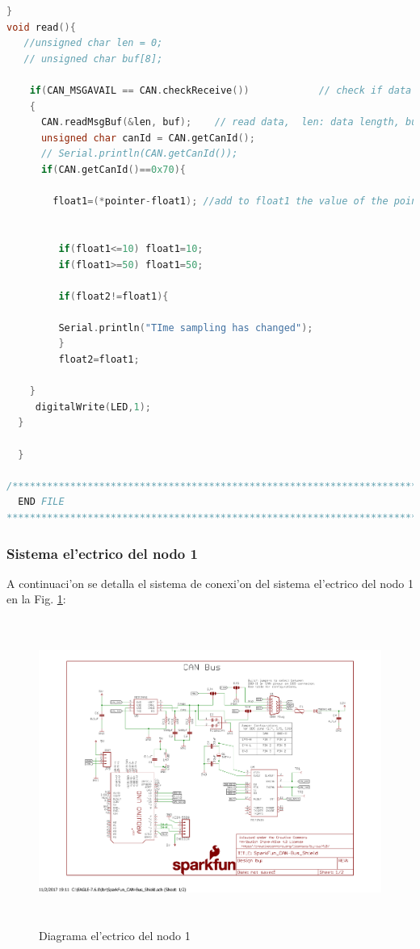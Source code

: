 {\begin{lstlisting}[language=C]
   }
void read(){
   //unsigned char len = 0;
   // unsigned char buf[8];

    if(CAN_MSGAVAIL == CAN.checkReceive())            // check if data coming
    {
      CAN.readMsgBuf(&len, buf);    // read data,  len: data length, buf: data buf
      unsigned char canId = CAN.getCanId();
      // Serial.println(CAN.getCanId());
      if(CAN.getCanId()==0x70){
       
        float1=(*pointer-float1); //add to float1 the value of the pointer from de CAN buffer (time sampling).
        
         
         if(float1<=10) float1=10;
         if(float1>=50) float1=50;
         
         if(float2!=float1){
         
         Serial.println("TIme sampling has changed");
         }
         float2=float1;
    
    }
     digitalWrite(LED,1);
  }
  
  }

/*********************************************************************************************************
  END FILE
*********************************************************************************************************/

\end{lstlisting}
}
\subsubsection{Sistema el'ectrico del nodo 1}

A continuaci'on se detalla el sistema de conexi'on del sistema el'ectrico del nodo 1 en la Fig. \ref{fig:nodo1electric}:

\begin{center}
\begin{figure}[ht]
	\centering
		\includegraphics[width=14cm, height=10cm]{nodo1elec}
	\caption{Diagrama el'ectrico del nodo 1}
	\label{fig:nodo1electric}
\end{figure}
\end{center}

